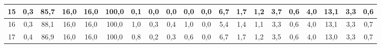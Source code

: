 \begin{sidewaystable}[]
\begin{tabular}{|c|c|c|c|c|c|c|c|c|c|c|c|c|c|c|c|c|c|c|c|}
    15 & 0,3                                              & 85,7                                            & 16,0                                            & 16,0                                            & 100,0                                           & 0,1                                             & 0,0                                             & 0,0                                             & 0,0                                             & 0,0                                             & 6,7                                              & 1,7                                              & 1,2                                              & 3,7                                              & 0,6                                              & 4,0                                              & 13,1                                             & 3,3                                              & 0,6                                              \\ \hline
    16 & 0,3                                              & 88,1                                            & 16,0                                            & 16,0                                            & 100,0                                           & 1,0                                             & 0,3                                             & 0,4                                             & 1,0                                             & 0,0                                             & 5,4                                              & 1,4                                              & 1,1                                              & 3,3                                              & 0,6                                              & 4,0                                              & 13,1                                             & 3,3                                              & 0,7                                              \\ \hline
    17 & 0,4                                              & 86,9                                            & 16,0                                            & 16,0                                            & 100,0                                           & 0,8                                             & 0,2                                             & 0,3                                             & 0,6                                             & 0,0                                             & 6,7                                              & 1,7                                              & 1,2                                              & 3,5                                              & 0,6                                              & 4,0                                              & 13,0                                             & 3,3                                              & 0,7                                              \\ \hline

\end{tabular}
\end{sidewaystable}

